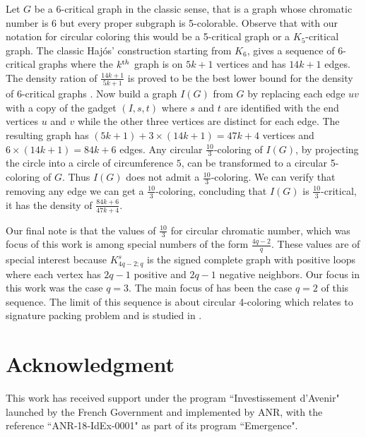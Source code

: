 \documentclass[11pt,a4paper]{article}
\theoremstyle{definition}
\begin{document}
Let $G$ be a $6$-critical graph in the classic sense, that is a graph whose chromatic number is 6 but every proper subgraph is 5-colorable. Observe that with our notation for circular coloring this would be a 5-critical graph or a $K_5$-critical graph. The classic Haj\'{o}s' construction starting from $K_6$, gives a sequence of $6$-critical graphs where the $k^{\text th}$ graph is on $5k+1$ vertices and has $14k+1$ edges. The density ration of $\frac{14k+1}{5k+1}$ is proved to be the best lower bound for the density of $6$-critical graphs \cite{KY14JCTB}. Now build a graph $I(G)$ from $G$ by replacing each edge $uv$ with a copy of the gadget $(I, s,t)$ where $s$ and $t$ are identified with the end vertices $u$ and $v$ while the other three vertices are distinct for each edge. The resulting graph has $(5k+1)+3\times(14k+1)=47k+4$ vertices and $6\times(14k+1)=84k+6$ edges. Any circular $\frac{10}{3}$-coloring of $I(G)$, by projecting the circle into a circle of circumference $5$, can be transformed to a circular 5-coloring of $G$. Thus $I(G)$ does not admit a $\frac{10}{3}$-coloring. We can verify that removing any edge we can get a $\frac{10}{3}$-coloring, concluding that $I(G)$ is $\frac{10}{3}$-critical, it has the density of $\frac{84k+6}{47k+4}$.     

Our final note is that the values of $\frac{10}{3}$ for circular chromatic number, which was focus of this work is among special numbers of the form $\frac{4q-2}{q}$. These values are of special interest because  $K_{4q-2;q}^s$ is the signed complete graph with positive loops where each vertex has $2q-1$ positive and $2q-1$ negative neighbors. Our focus in this work was the case $q=3$. The main focus of \cite{BHNSW24} has been the case $q=2$ of this sequence. The limit of this sequence is about circular 4-coloring which relates to signature packing problem and is studied in \cite{NY25+}.










    

\section*{Acknowledgment} This work has received support under the program ``Investissement d'Avenir" launched by the French Government and implemented by ANR, with the reference ``ANR‐18‐IdEx‐0001" as part of its program ``Emergence".




\end{document}
